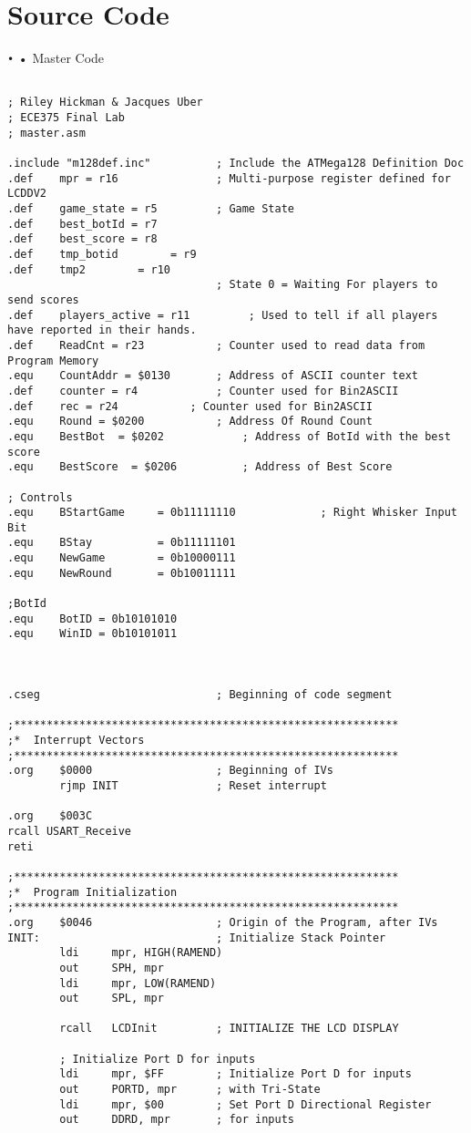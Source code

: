 \documentclass[10pt,letterpaper]{article}
\begin{document}
\section{Source Code}
\texttt{•}
\footnotesize{•}
Master Code
\begin{verbatim}

; Riley Hickman & Jacques Uber
; ECE375 Final Lab
; master.asm

.include "m128def.inc"			; Include the ATMega128 Definition Doc
.def	mpr = r16				; Multi-purpose register defined for LCDDV2
.def	game_state = r5			; Game State
.def    best_botId = r7
.def    best_score = r8
.def    tmp_botid        = r9
.def    tmp2        = r10
                                ; State 0 = Waiting For players to send scores
.def    players_active = r11         ; Used to tell if all players have reported in their hands.
.def	ReadCnt = r23			; Counter used to read data from Program Memory
.equ	CountAddr = $0130		; Address of ASCII counter text
.def	counter = r4			; Counter used for Bin2ASCII
.def	rec = r24			; Counter used for Bin2ASCII
.equ	Round = $0200		    ; Address Of Round Count
.equ	BestBot  = $0202		    ; Address of BotId with the best score
.equ	BestScore  = $0206		    ; Address of Best Score

; Controls
.equ	BStartGame     = 0b11111110				; Right Whisker Input Bit
.equ	BStay          = 0b11111101
.equ    NewGame        = 0b10000111
.equ    NewRound       = 0b10011111

;BotId
.equ    BotID = 0b10101010
.equ    WinID = 0b10101011



.cseg							; Beginning of code segment

;***********************************************************
;*	Interrupt Vectors
;***********************************************************
.org	$0000					; Beginning of IVs
		rjmp INIT				; Reset interrupt

.org    $003C
rcall USART_Receive
reti

;***********************************************************
;*	Program Initialization
;***********************************************************
.org	$0046					; Origin of the Program, after IVs
INIT:							; Initialize Stack Pointer
		ldi		mpr, HIGH(RAMEND)
		out		SPH, mpr
		ldi		mpr, LOW(RAMEND)
		out		SPL, mpr

		rcall	LCDInit			; INITIALIZE THE LCD DISPLAY

        ; Initialize Port D for inputs
        ldi     mpr, $FF        ; Initialize Port D for inputs
        out     PORTD, mpr      ; with Tri-State
        ldi     mpr, $00        ; Set Port D Directional Register
        out     DDRD, mpr       ; for inputs


\end{verbatim}
\end{document}
